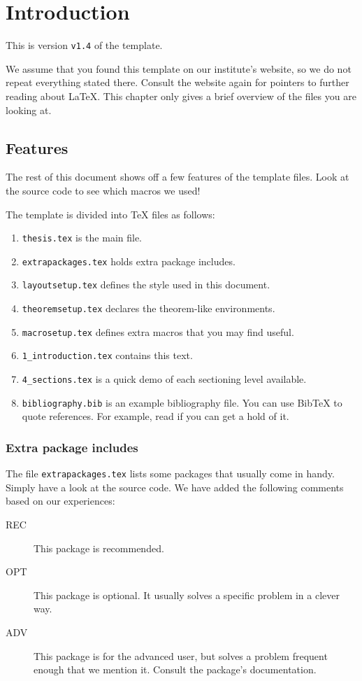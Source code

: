\newcommand{\package}{\emph}

\chapter{Introduction}

This is version \verb-v1.4- of the template.

We assume that you found this template on our institute's website, so
we do not repeat everything stated there.  Consult the website again
for pointers to further reading about \LaTeX{}.  This chapter only
gives a brief overview of the files you are looking at.

\section{Features}
\label{sec:features}

The rest of this document shows off a few features of the template
files.  Look at the source code to see which macros we used!

The template is divided into \TeX{} files as follows:
\begin{enumerate}
\item \texttt{thesis.tex} is the main file.
\item \texttt{extrapackages.tex} holds extra package includes.
\item \texttt{layoutsetup.tex} defines the style used in this document.
\item \texttt{theoremsetup.tex} declares the theorem-like environments.
\item \texttt{macrosetup.tex} defines extra macros that you may find
  useful.
\item \texttt{1\_introduction.tex} contains this text.
\item \texttt{4\_sections.tex} is a quick demo of each sectioning level
  available.
\item \texttt{bibliography.bib} is an example bibliography file.  You can use
  Bib\TeX{} to quote references.  For example, read
  \cite{bringhurst1996ets} if you can get a hold of it.
\end{enumerate}


\subsection{Extra package includes}

The file \texttt{extrapackages.tex} lists some packages that usually
come in handy.  Simply have a look at the source code.  We have
added the following comments based on our experiences:
\begin{description}
\item[REC] This package is recommended.
\item[OPT] This package is optional.  It usually solves a specific
  problem in a clever way.
\item[ADV] This package is for the advanced user, but solves a problem
  frequent enough that we mention it. Consult the package's
  documentation.
\end{description}

